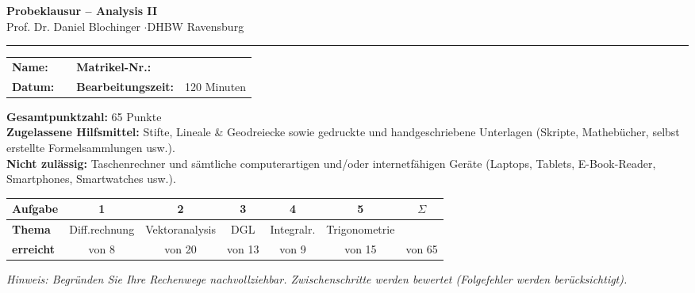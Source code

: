 \documentclass[a4paper,11pt]{article}
\begin{document}
\begin{center}
  {\LARGE\bfseries\color{accent} Probeklausur -- Analysis II}\\[0.3em]
  {\normalsize Prof. Dr. Daniel Blochinger \quad$\cdot$\quad DHBW Ravensburg}
\end{center}
\vspace{0.6em}
\noindent\textcolor{gridcol}{\rule{\linewidth}{1pt}}\par\vspace{0.8em}

\renewcommand{\arraystretch}{1.8}
\noindent
\begin{tabular}{@{}p{2.2cm}p{5.3cm}@{\quad}p{3.6cm}p{4.5cm}@{}}
\textbf{Name:} & \textcolor{gridcol}{\hrulefill} & \textbf{Matrikel-Nr.:} & \textcolor{gridcol}{\hrulefill}\\
\textbf{Datum:} & \textcolor{gridcol}{\hrulefill} & \textbf{Bearbeitungszeit:} & 120 Minuten\\
\end{tabular}
\renewcommand{\arraystretch}{1.0}

\vspace{0.6em}
\noindent\textbf{Gesamtpunktzahl:} 65 Punkte\\[0.4em]
\noindent\textbf{Zugelassene Hilfsmittel:} Stifte, Lineale \& Geodreiecke sowie gedruckte und
handgeschriebene Unterlagen (Skripte, Mathebücher, selbst erstellte Formelsammlungen usw.).\\[0.2em]
\noindent\textbf{Nicht zulässig:} Taschenrechner und sämtliche computerartigen und/oder
internetfähigen Geräte (Laptops, Tablets, E-Book-Reader, Smartphones, Smartwatches usw.).

\vspace{1.0em}

\renewcommand{\arraystretch}{1.6}
\noindent
\begin{tabular}{|>{\bfseries}l|c|c|c|c|c||c|}
\hline
Aufgabe & 1 & 2 & 3 & 4 & 5 & $\Sigma$\\\hline
Thema & Diff.rechnung & Vektoranalysis & DGL & Integralr. & Trigonometrie & \\\hline
erreicht & von 8 & von 20 & von 13 & von 9 & von 15 & von 65\\\hline
\end{tabular}
\renewcommand{\arraystretch}{1.0}

\vspace{1.0em}
\noindent\textit{Hinweis: Begründen Sie Ihre Rechenwege nachvollziehbar. Zwischenschritte werden
bewertet (Folgefehler werden berücksichtigt).}
\end{document}
